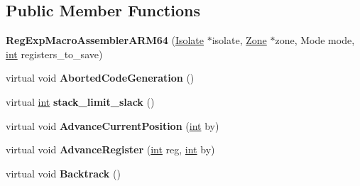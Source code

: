 \subsection*{Public Member Functions}
\begin{DoxyCompactItemize}
\item 
\mbox{\label{classv8_1_1internal_1_1RegExpMacroAssemblerARM64_a7d51531c070c825ebe027f0e464c13fe}} 
{\bfseries Reg\+Exp\+Macro\+Assembler\+A\+R\+M64} (\mbox{\hyperlink{classv8_1_1internal_1_1Isolate}{Isolate}} $\ast$isolate, \mbox{\hyperlink{classv8_1_1internal_1_1Zone}{Zone}} $\ast$zone, Mode mode, \mbox{\hyperlink{classint}{int}} registers\+\_\+to\+\_\+save)
\item 
\mbox{\label{classv8_1_1internal_1_1RegExpMacroAssemblerARM64_afb87ede3a4d93841dd3fe00cb54823df}} 
virtual void {\bfseries Aborted\+Code\+Generation} ()
\item 
\mbox{\label{classv8_1_1internal_1_1RegExpMacroAssemblerARM64_a89da264dd8281d69aa8888ca3708da7b}} 
virtual \mbox{\hyperlink{classint}{int}} {\bfseries stack\+\_\+limit\+\_\+slack} ()
\item 
\mbox{\label{classv8_1_1internal_1_1RegExpMacroAssemblerARM64_a7507f75eb20b15459072c267cee4c451}} 
virtual void {\bfseries Advance\+Current\+Position} (\mbox{\hyperlink{classint}{int}} by)
\item 
\mbox{\label{classv8_1_1internal_1_1RegExpMacroAssemblerARM64_aa3ba92e18353224c167b57f811ddb66a}} 
virtual void {\bfseries Advance\+Register} (\mbox{\hyperlink{classint}{int}} reg, \mbox{\hyperlink{classint}{int}} by)
\item 
\mbox{\label{classv8_1_1internal_1_1RegExpMacroAssemblerARM64_a875d7462d677cb0c32762c248733f499}} 
virtual void {\bfseries Backtrack} ()
\item 
\mbox{\label{classv8_1_1internal_1_1RegExpMacroAssemblerARM64_a596ab0b9f46512e4aa849b9ad71b5fab}} 

\end{DoxyCompactItemize}
